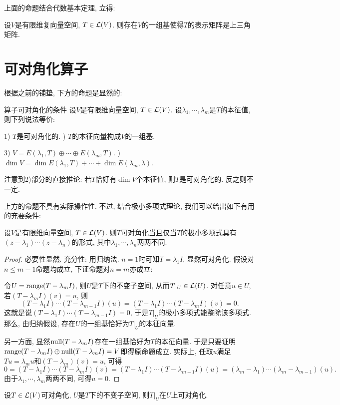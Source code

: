 上面的命题结合代数基本定理, 立得: 

\begin{corollary}{}
	设$V$是有限维复向量空间, $T \in \mathcal{L} (V)$. 则存在$V$的一组基使得$T$的表示矩阵是上三角矩阵. 
\end{corollary}



\newpage
\section{可对角化算子}

根据之前的铺垫, 下方的命题是显然的: 

\begin{proposition}{算子可对角化的条件}
	设$V$是有限维向量空间, $T \in \mathcal{L} (V)$. 设$\lambda _1,\cdots ,\lambda _m$是$T$的本征值, 则下列说法等价: 
	
	1) $T$是可对角化的. ) $T$的本征向量构成$V$的一组基. 
	
	3) $V=E(\lambda _1,T) \oplus \cdots \oplus E(\lambda _m,T)$. ) $\dim V = \dim E(\lambda _1,T) + \cdots + \dim E(\lambda _m,\lambda)$. 
\end{proposition}

注意到2)部分的直接推论: 若$T$恰好有$\dim V$个本征值, 则$T$是可对角化的. 反之则不一定. 

上方的命题不具有实际操作性. 不过, 结合极小多项式理论, 我们可以给出如下有用的充要条件: 

\begin{proposition}{}
	设$V$是有限维向量空间, $T \in \mathcal{L} (V)$. 则$T$可对角化当且仅当$T$的极小多项式具有$(z-\lambda _1)\cdots (z-\lambda _n)$的形式, 其中$\lambda _1,\cdots ,\lambda _n$两两不同. 
\end{proposition}
\begin{proof}
	必要性显然. 充分性: 用归纳法. $n=1$时可知$T=\lambda _1I$, 显然可对角化. 假设对$n \leq m-1$命题均成立, 下证命题对$n=m$亦成立: 
	
	令$U=\operatorname{range} (T-\lambda _mI)$, 则$U$是$T$下的不变子空间, 从而$T|_U \in \mathcal{L} (U)$. 对任意$u \in U$, 若$(T-\lambda _mI)(v)=u$, 则$$(T-\lambda _1I) \cdots (T-\lambda _{m-1}I)(u) = (T-\lambda _1I) \cdots (T-\lambda _mI)(v) = 0.$$
	这就是说$(T-\lambda _1I) \cdots (T-\lambda _{m-1}I)=0$, 于是$T|_U$的极小多项式能整除该多项式. 那么, 由归纳假设, 存在$U$的一组基恰好为$T|_U$的本征向量. 
	
	另一方面, 显然$\operatorname{null} (T-\lambda _mI)$存在一组基恰好为$T$的本征向量. 于是只要证明$\operatorname{range} (T-\lambda _mI) \oplus \operatorname{null} (T-\lambda _mI) = V$即得原命题成立. 实际上, 任取$u$满足$Tu=\lambda _mu$和$(T-\lambda _m)(v)=u$, 可得$$0 = (T-\lambda _1I) \cdots (T-\lambda _{m}I)(v) = (T-\lambda _1I) \cdots (T-\lambda _{m-1}I)(u) = (\lambda _m-\lambda _1) \cdots (\lambda _m-\lambda _{m-1}) (u).$$
	由于$\lambda _1,\cdots ,\lambda _m$两两不同, 可得$u=0$. 
\end{proof}

\begin{corollary}{}
	设$T \in \mathcal{L} (V)$可对角化, $U$是$T$下的不变子空间, 则$T|_U$在$U$上可对角化. 
\end{corollary}